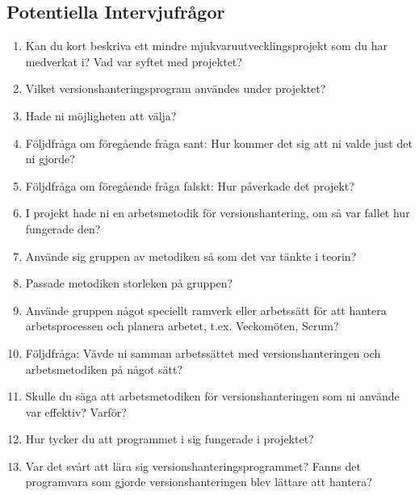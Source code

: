\subsection{ Potentiella Intervjufrågor } \vspace{1em}
\begin{enumerate}

  \item Kan du kort beskriva ett mindre mjukvaruutvecklingsprojekt som du har medverkat i? Vad var syftet med projektet?

  \item Vilket versionshanteringsprogram användes under projektet?

  \item Hade ni möjligheten att välja?

  \item Följdfråga om föregående fråga sant: Hur kommer det sig att ni valde just det ni gjorde?
  \item Följdfråga om föregående fråga falskt: Hur påverkade det projekt?

  \item I projekt hade ni en arbetsmetodik för versionshantering, om så var fallet hur fungerade den?

  \item Använde sig gruppen av metodiken så som det var tänkte i teorin?

  \item Passade metodiken storleken på gruppen?

  \item Använde gruppen något speciellt ramverk eller arbetssätt för att hantera arbetsprocessen och planera arbetet, t.ex. Veckomöten, Scrum?

  \item Följdfråga: Vävde ni samman arbetssättet med versionshanteringen och arbetsmetodiken på något sätt?

  \item Skulle du säga att arbetsmetodiken för versionshanteringen som ni använde var effektiv? Varför?

  \item Hur tycker du att programmet i sig fungerade i projektet?

  \item Var det svårt att lära sig versionshanteringsprogrammet? Fanns det programvara som gjorde versionshanteringen blev lättare att hantera?

\end{enumerate}

